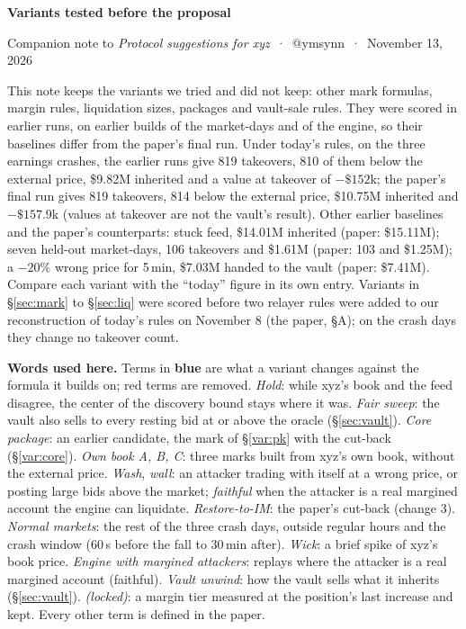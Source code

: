 \documentclass[10.5pt,a4paper]{article}
\begin{document}
\setlength{\parskip}{.35ex}
{\LARGE\bfseries Variants tested before the proposal\par}\vspace{.5ex}
{\normalsize Companion note to \emph{Protocol suggestions for xyz} \,·\, @ymsynn \,·\, November 13, 2026\par}\vspace{1.5ex}

This note keeps the variants we tried and did not keep: other mark formulas, margin rules, liquidation sizes, packages and vault-sale rules. They were scored in earlier runs, on earlier builds of the market-days and of the engine, so their baselines differ from the paper's final run. Under today's rules, on the three earnings crashes, the earlier runs give 819 takeovers, 810 of them below the external price, \$9.82M inherited and a value at takeover of $-\$152$k; the paper's final run gives 819 takeovers, 814 below the external price, \$10.75M inherited and $-\$157.9$k (values at takeover are not the vault's result). Other earlier baselines and the paper's counterparts: stuck feed, \$14.01M inherited (paper: \$15.11M); seven held-out market-days, 106 takeovers and \$1.61M (paper: 103 and \$1.25M); a $-20\%$ wrong price for 5\,min, \$7.03M handed to the vault (paper: \$7.41M). Compare each variant with the ``today'' figure in its own entry. Variants in \S\ref{sec:mark} to \S\ref{sec:liq} were scored before two relayer rules were added to our reconstruction of today's rules on November 8 (the paper, \S A); on the crash days they change no takeover count.

\textbf{Words used here.} Terms in \textcolor[HTML]{2F74D0}{\textbf{blue}} are what a variant changes against the formula it builds on; red terms are removed. \emph{Hold}: while xyz's book and the feed disagree, the center of the discovery bound stays where it was. \emph{Fair sweep}: the vault also sells to every resting bid at or above the oracle (\S\ref{sec:vault}). \emph{Core package}: an earlier candidate, the mark of \S\ref{var:pk} with the cut-back (\S\ref{var:core}). \emph{Own book A, B, C}: three marks built from xyz's own book, without the external price. \emph{Wash}, \emph{wall}: an attacker trading with itself at a wrong price, or posting large bids above the market; \emph{faithful} when the attacker is a real margined account the engine can liquidate. \emph{Restore-to-IM}: the paper's cut-back (change 3). \emph{Normal markets}: the rest of the three crash days, outside regular hours and the crash window (60\,s before the fall to 30\,min after). \emph{Wick}: a brief spike of xyz's book price. \emph{Engine with margined attackers}: replays where the attacker is a real margined account (faithful). \emph{Vault unwind}: how the vault sells what it inherits (\S\ref{sec:vault}). \emph{(locked)}: a margin tier measured at the position's last increase and kept. Every other term is defined in the paper.
\end{document}
